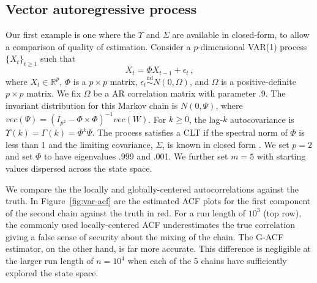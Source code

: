 \documentclass[12pt]{article}
\theoremstyle{remark}
\begin{document}
\subsection{Vector autoregressive process} \label{ex:var}

 
Our first example is one where the $\Upsilon$ and $\Sigma$ are available in closed-form, to allow a comparison of quality of estimation. Consider a $p$-dimensional VAR(1) process $\{X_t\}_{t \geq 1}$ such that
%
\begin{equation*}
X_t = \Phi X_{t-1} + \epsilon_t\,,  
\end{equation*}
%
where $X_t \in \mathbb{R}^p$, $\Phi $ is a $p \times p $ matrix, $ \epsilon_t \overset{\text{iid}}{\sim} N(0, \Omega)$, and $\Omega$ is a positive-definite $p \times p$ matrix. We fix $\Omega$ be a AR correlation matrix with parameter .9. The invariant distribution for this Markov chain is $N(0, \Psi)$, where $vec(\Psi) = (I_{p^2} - \Phi \times \Phi)^{-1} vec(W)$.  For $k \geq 0$, the lag-$k$ autocovariance is $\Upsilon(k) = \Gamma(k) = \Phi^k\Psi$. The process satisfies a CLT if the spectral norm of $\Phi$ is less than 1 \citep{tjos:1990} and the limiting covariance, $\Sigma$, is known in closed form \citep{dai:jon:2017}. We set $p = 2$ and set $\Phi$ to have eigenvalues .999 and .001. 
We further set $m = 5$ with starting values dispersed across the state space.  

We compare the the locally and globally-centered autocorrelations against the truth. In Figure~\ref{fig:var-acf} are the estimated ACF plots for the first component of the second chain against the truth in red. For a run length of $10^3$ (top row), the commonly used locally-centered ACF underestimates the true correlation giving a false sense of security about the mixing of the chain. The G-ACF estimator, on the other hand, is far more accurate. This difference is negligible at the larger run length of $n = 10^4$ when each of the 5 chains have sufficiently explored the state space.
\end{document}
